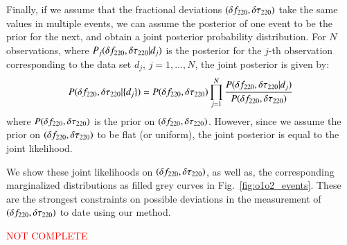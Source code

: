 Finally, if we assume that the fractional deviations $(\delta f_{\text{220}},
\delta \tau_{\text{220}})$ take the same values in multiple events, we can assume
the posterior of one event to be the prior for the next, and obtain a
joint posterior probability distribution. For $N$ observations, where
$P_j(\delta f_{\text{220}}, \delta \tau_{\text{220}} | d_j)$ is the posterior for the $j$-th
observation corresponding to the data set $d_j$, $j=1,\dots,N$, the joint
posterior is given by:
%
\begin{equation}
P(\delta f_{\text{220}}, \delta \tau_{\text{220}} | \{d_j\}) = P(\delta f_{\text{220}}, \delta \tau_{\text{220}}) \prod _{j=1}^N \frac{P(\delta f_{\text{220}}, \delta \tau_{\text{220}} | d_j) }{P(\delta f_{\text{220}}, \delta \tau_{\text{220}})}
\end{equation}
%
where $P(\delta f_{\text{220}}, \delta \tau_{\text{220}})$ is the prior on $(\delta f_{\text{220}},
\delta \tau_{\text{220}})$. However, since we assume the prior on $(\delta f_{\text{220}},
\delta \tau_{\text{220}})$ to be flat (or uniform), the joint posterior is equal to
the joint likelihood.

We show these joint likelihoods on $(\delta f_{\text{220}}, \delta \tau_{\text{220}})$, as well as, the corresponding  marginalized distributions as filled grey curves in Fig.~\ref{fig:o1o2_events}.
These are the strongest constraints on possible deviations in the measurement of $(\delta f_{\text{220}}, \delta \tau_{\text{220}})$ to date using our method.


\begin{table}

\caption{\textcolor{red}{NOT COMPLETE} }
\label{tab:qnm_o1o2_results}
\end{table}

